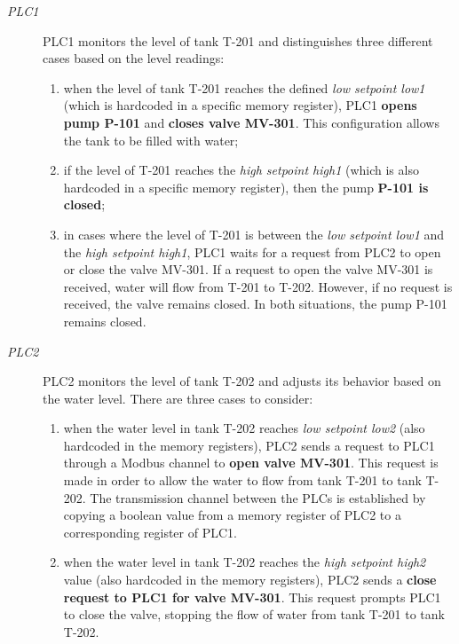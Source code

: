 \begin{description}
	\item[\textit{PLC1}] PLC1 monitors the level of tank T-201 and distinguishes three different cases based on the level readings:
	
	\begin{enumerate}
		\item when the level of tank T-201 reaches the defined \textit{low setpoint low1} (which is hardcoded in a specific memory register), PLC1 \textbf{opens pump P-101} and \textbf{closes valve MV-301}. This configuration allows the tank to be filled with water;
		
		\item if the level of T-201 reaches the \textit{high setpoint high1} (which is also hardcoded in a specific memory register), then the pump \textbf{P-101 is closed};
		
		\item in cases where the level of T-201 is between the \textit{low setpoint low1} and the \textit{high setpoint high1}, PLC1 waits for a request from PLC2 to open or close the valve MV-301. If a request to open the valve MV-301 is received, water will flow from T-201 to T-202. However, if no request is received, the valve remains closed. In both situations, the pump P-101 remains closed.
	\end{enumerate}

	\item[\textit{PLC2}] PLC2 monitors the level of tank T-202 and adjusts its behavior based on the water level. There are three cases to consider:
	
	\begin{enumerate}
		\item when the water level in tank T-202 reaches \textit{low setpoint low2} (also hardcoded in the memory registers), PLC2 sends a request to PLC1 through a Modbus channel to \textbf{open valve MV-301}. This request is made in order to allow the water to flow from tank T-201 to tank T-202. The transmission channel between the PLCs is established by copying a boolean value from a memory register of PLC2 to a corresponding register of PLC1.
		
		\item when the water level in tank T-202 reaches the \textit{high setpoint high2} value (also hardcoded in the memory registers), PLC2 sends a \textbf{close request to PLC1 for valve MV-301}. This request prompts PLC1 to close the valve, stopping the flow of water from tank T-201 to tank T-202.
		

\end{enumerate}
\end{description}
